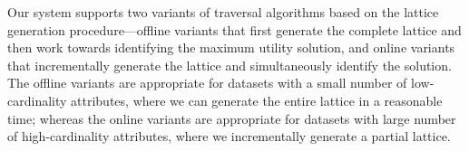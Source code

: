  Our system supports two variants of traversal algorithms based on the lattice generation procedure---offline variants that first generate the complete lattice and then work towards identifying the maximum utility solution, and online variants that incrementally generate the lattice and simultaneously identify the solution. The offline variants are appropriate for datasets with a small number of low-cardinality attributes, where we can generate the entire lattice in a reasonable time; whereas the online variants are appropriate for datasets with large number of high-cardinality attributes, where we incrementally generate a partial lattice.


